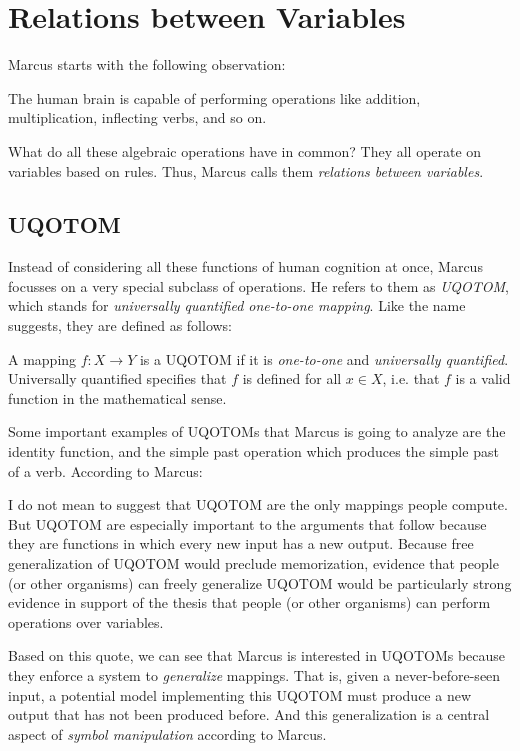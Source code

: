 \documentclass[../../main.tex]{subfiles}
\begin{document}
\chapter{Relations between Variables}
Marcus starts with the following observation:

\begin{observation}
    The human brain is capable of performing operations like addition, multiplication, inflecting verbs, and so on.
\end{observation}

What do all these algebraic operations have in common? They all operate on variables based on rules. Thus, Marcus calls them \emph{relations between variables}.

\section{UQOTOM}
Instead of considering all these functions of human cognition at once, Marcus focusses on a very special subclass of operations. He refers to them as \emph{UQOTOM}, which stands for \emph{universally quantified one-to-one mapping}. Like the name suggests, they are defined as follows:

\begin{definition}[UQOTOM]
    A mapping $f: X \to Y$ is a UQOTOM if it is \emph{one-to-one} and \emph{universally quantified}. Universally quantified specifies that $f$ is defined for all $x \in X$, i.e. that $f$ is a valid function in the mathematical sense.
\end{definition}

Some important examples of UQOTOMs that Marcus is going to analyze are the identity function, and the simple past operation which produces the simple past of a verb. According to Marcus:

\begin{citecallout}
    I do not mean to suggest that UQOTOM are the only mappings
    people compute. But UQOTOM are especially important to the arguments that follow because they are functions in which every new input has a new output. Because free generalization of UQOTOM would
    preclude memorization, evidence that people (or other organisms) can
    freely generalize UQOTOM would be particularly strong evidence in
    support of the thesis that people (or other organisms) can perform operations over variables.
\end{citecallout}

Based on this quote, we can see that Marcus is interested in UQOTOMs because they enforce a system to \emph{generalize} mappings. That is, given a never-before-seen input, a potential model implementing this UQOTOM must produce a new output that has not been produced before. And this generalization is a central aspect of \emph{symbol manipulation} according to Marcus.
\end{document}
